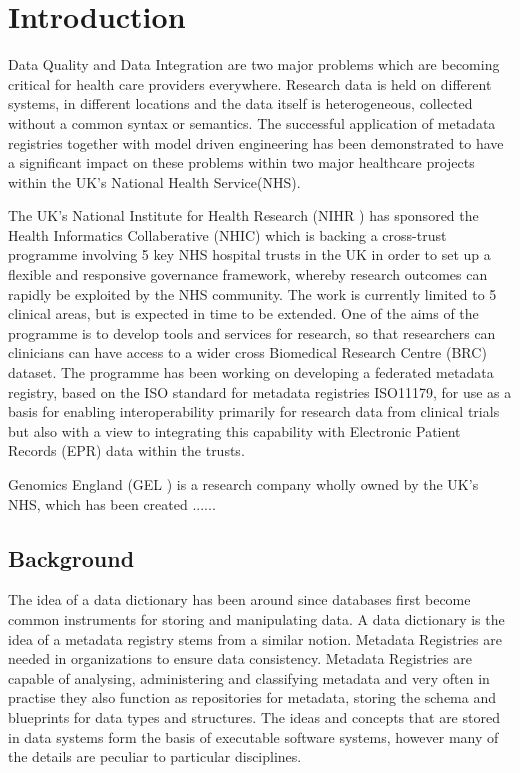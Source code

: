 

\section{Introduction}

Data Quality and Data Integration are two major problems which are becoming critical for health care providers everywhere. Research data is held on different systems, in different locations and the data itself is heterogeneous, collected without a common syntax or semantics. The successful application of metadata registries together with model driven engineering has been demonstrated to have a significant impact on these problems within two major healthcare projects within the UK's National Health Service(NHS).

The UK's National Institute for Health Research (NIHR \cite{NIHR}) has sponsored the Health Informatics Collaberative (NHIC) which is backing a cross-trust programme involving 5 key NHS hospital trusts in the UK in order to set up a flexible and responsive governance framework, whereby research outcomes can rapidly be exploited by the NHS community. The work is currently limited to 5 clinical areas, but is expected in time to be extended. One of the aims of the programme is to develop tools and services for research, so that researchers can clinicians can have access to a wider cross Biomedical Research Centre (BRC) dataset. The programme has been working on developing a federated metadata registry, based on the ISO standard for metadata registries ISO11179\cite{ISO11179}, for use as a basis for enabling interoperability primarily for research data from clinical trials but also with a view to integrating this capability with Electronic Patient Records (EPR) data within the trusts.

Genomics England (GEL \cite{GEL}) is a research company wholly owned by the UK's NHS, which has been created ......

\subsection{Background}
The idea of a data dictionary has been around since databases first become common instruments for storing and manipulating data. A data dictionary is  the idea of a metadata registry stems from a similar notion.
Metadata Registries are needed in organizations to ensure data consistency. Metadata Registries are capable of analysing, administering and classifying metadata and very often in practise they also function as repositories for metadata, storing the schema and blueprints for data types and structures. The ideas and concepts that are stored in data systems form the basis of executable software systems, however many of the details are peculiar to particular disciplines.  

